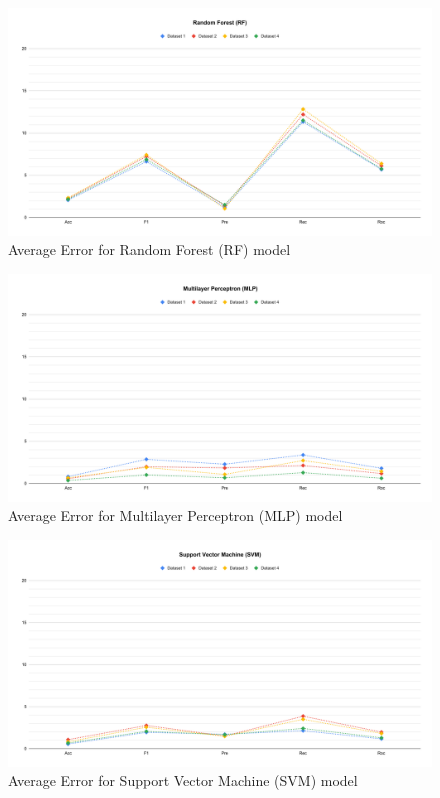 {    \begin{figure}[ht]
        \centering
        \includegraphics[width=1.9\columnwidth]{media/ch_result_and_testing/delta_RF.pdf}
        \caption{Average Error for Random Forest (RF) model} \label{fig:perfromance_delta_rf}
    \end{figure}

    \begin{figure}[ht]
        \centering
        \includegraphics[width=1.9\columnwidth]{media/ch_result_and_testing/delta_MLP.pdf}
        \caption{Average Error for Multilayer Perceptron (MLP) model} \label{fig:perfromance_delta_mlp}
    \end{figure}

    \begin{figure}[ht]
        \centering
        \includegraphics[width=1.9\columnwidth]{media/ch_result_and_testing/delta_SVM.pdf}
        \caption{Average Error for Support Vector Machine (SVM) model} \label{fig:perfromance_delta_svm}
    \end{figure}

}
